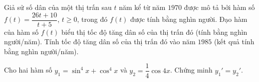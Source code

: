 \begin{ex}%
	Giả sử số dân của một thị trấn sau $t$ năm kể từ năm $1970$ được mô tả bởi hàm số $f(t)=\dfrac{26 t+10}{t+5}$, $t \geq 0$, trong đó $f(t)$ được tính bằng nghìn người. Đạo hàm của hàm số $f(t)$ biểu thị tốc độ tăng dân số của thị trấn đó (tính bằng nghìn người/năm). Tính tốc độ tăng dân số của thị trấn đó vào năm $1985$ (kết quả tính bằng nghìn người/năm).
\end{ex}

\begin{ex}%
	Cho hai hàm số $y_1=\sin^4x+\cos ^4x$ và $y_2=\dfrac{1}{4}\cos 4x$. Chứng minh $y_1'=y_2'$.
\end{ex}

